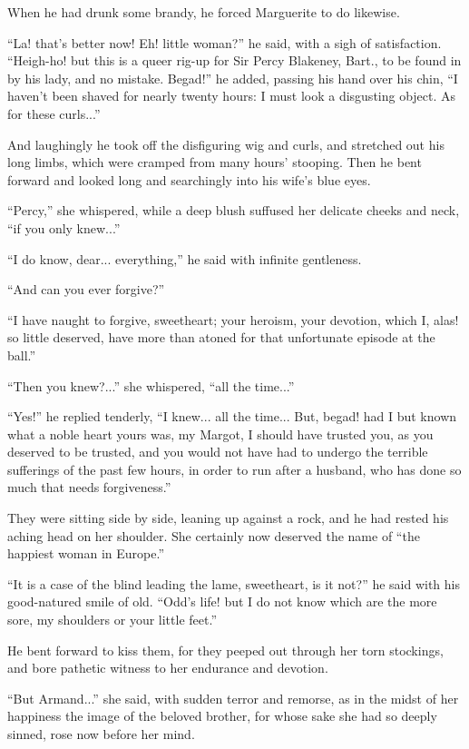 \documentclass[paper=a5,BCOR=7mm,twoside,DIV=calc,12pt,usegeometry,chapterprefix,endperiod,headings=big]{scrbook}
\begin{document}
When he had drunk some brandy, he forced Marguerite to do likewise.

\enquote{La! that's better now! Eh! little woman?} he said, with a sigh of satisfaction. \enquote{Heigh-ho! but this is a queer rig-up for Sir Percy Blakeney, Bart., to be found in by his lady, and no mistake. Begad!} he added, passing his hand over his chin, \enquote{I haven't been shaved for nearly twenty hours: I must look a disgusting object. As for these curls...}

And laughingly he took off the disfiguring wig and curls, and stretched out his long limbs, which were cramped from many hours’ stooping. Then he bent forward and looked long and searchingly into his wife's blue eyes.

\enquote{Percy,} she whispered, while a deep blush suffused her delicate cheeks and neck, \enquote{if you only knew...}

\enquote{I do know, dear... everything,} he said with infinite gentleness.

\enquote{And can you ever forgive?}

\enquote{I have naught to forgive, sweetheart; your heroism, your devotion, which I, alas! so little deserved, have more than atoned for that unfortunate episode at the ball.}

\enquote{Then you knew?...} she whispered, \enquote{all the time...}

\enquote{Yes!} he replied tenderly, \enquote{I knew... all the time... But, begad! had I but known what a noble heart yours was, my Margot, I should have trusted you, as you deserved to be trusted, and you would not have had to undergo the terrible sufferings of the past few hours, in order to run after a husband, who has done so much that needs forgiveness.}

They were sitting side by side, leaning up against a rock, and he had rested his aching head on her shoulder. She certainly now deserved the name of \enquote{the happiest woman in Europe.}

\enquote{It is a case of the blind leading the lame, sweetheart, is it not?} he said with his good-natured smile of old. \enquote{Odd's life! but I do not know which are the more sore, my shoulders or your little feet.}

He bent forward to kiss them, for they peeped out through her torn stockings, and bore pathetic witness to her endurance and devotion.

\enquote{But Armand...} she said, with sudden terror and remorse, as in the midst of her happiness the image of the beloved brother, for whose sake she had so deeply sinned, rose now before her mind.
\end{document}
